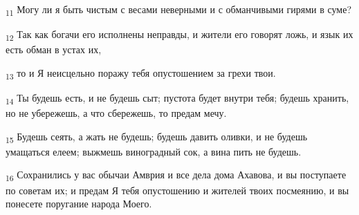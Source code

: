 \begin{tcolorbox}
\textsubscript{11} Могу ли я быть чистым с весами неверными и с обманчивыми гирями в суме?
\end{tcolorbox}
\begin{tcolorbox}
\textsubscript{12} Так как богачи его исполнены неправды, и жители его говорят ложь, и язык их есть обман в устах их,
\end{tcolorbox}
\begin{tcolorbox}
\textsubscript{13} то и Я неисцельно поражу тебя опустошением за грехи твои.
\end{tcolorbox}
\begin{tcolorbox}
\textsubscript{14} Ты будешь есть, и не будешь сыт; пустота будет внутри тебя; будешь хранить, но не убережешь, а что сбережешь, то предам мечу.
\end{tcolorbox}
\begin{tcolorbox}
\textsubscript{15} Будешь сеять, а жать не будешь; будешь давить оливки, и не будешь умащаться елеем; выжмешь виноградный сок, а вина пить не будешь.
\end{tcolorbox}
\begin{tcolorbox}
\textsubscript{16} Сохранились у вас обычаи Амврия и все дела дома Ахавова, и вы поступаете по советам их; и предам Я тебя опустошению и жителей твоих посмеянию, и вы понесете поругание народа Моего.
\end{tcolorbox}
